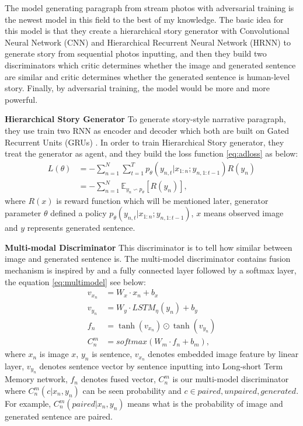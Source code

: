 \documentclass[11pt]{article}
\begin{document}
The model generating paragraph from stream photos with adversarial training is the newest model in this field to the best of my knowledge. The basic idea for this model is that they create a hierarchical story generator with Convolutional Neural Network (CNN) and Hierarchical Recurrent Neural Network (HRNN) to generate story from sequential photos inputting, and then they build two discriminators which critic determines whether the image and generated sentence are similar and critic determines whether the generated sentence is human-level story. Finally, by adversarial training, the model would be more and more powerful.


{\bf Hierarchical Story Generator} To generate story-style narrative paragraph, they use train two RNN as encoder and decoder which both are built on Gated Recurrent Units (GRUs) \cite{DBLP:journals/corr/ChungGCB14}. In order to train Hierarchical Story generator, they treat the generator as agent, and they build the loss function \ref{eq:adloss} as below:
\begin{equation}
\begin{aligned}
L(\theta) &= - \sum_{n=1}^{N} \sum_{t=1}^{T} p_{\theta} (y_{n,t}|x_{1:n};y_{n,1:t-1})R(y_n) \\
&= -\sum_{n=1}^{N} \mathds{E}_{y_{n} \backsim  p_{\theta}} [R(y_{n})], 
\end{aligned}
\label{eq:adloss}
\end{equation}
where $R(x)$ is reward function which will be mentioned later, generator parameter $\theta$ defined a policy $p_{\theta} (y_{n,t}|x_{1:n};y_{n,1:t-1})$, $x$ means observed image and $y$ represents generated sentence. 

{\bf Multi-modal Discriminator} This discriminator is to tell how similar between image and generated sentence is. The multi-model discriminator contains fusion mechanism is inspired by \cite{VQA} and a fully connected layer followed by a softmax layer, the equation \ref{eq:multimodel} see below:
\begin{equation}
\begin{aligned}
v_{x_{n}} &= W_{x} \cdot x_{n} + b_{x} \\
v_{y_{n}} &= W_{y} \cdot LSTM_{\eta}(y_{n}) + b_{y} \\
f_{n} &= \tanh(v_{x_{n}}) \odot \tanh(v_{y_{n}}) \\
C_{n}^{m} &= softmax(W_{m} \cdot f_{n} + b_{m}),  
\end{aligned}
\label{eq:multimodel}
\end{equation}
where $x_n$ is image $x$, $y_n$ is sentence, $v_{x_{n}}$ denotes embedded image feature by linear layer, $v_{y_{n}}$ denotes sentence vector by sentence inputting into Long-short Term Memory network, $f_n$ denotes fused vector, $C_{n}^{m}$ is our multi-model discriminator where $C_{n}^{m}(c|x_{n}, y_{n})$ can be seen probability and $c \in {paired, unpaired, generated}$. For example, $C_{n}^{m}(paired|x_{n}, y_{n})$ means what is the probability of image and generated sentence are paired.
\end{document}
